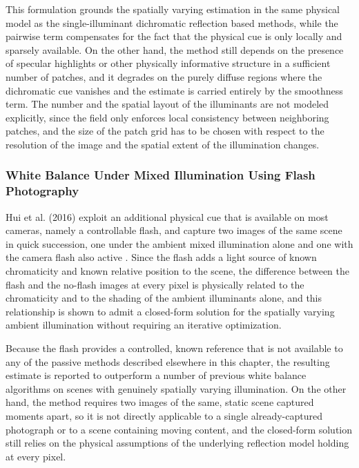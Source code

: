 This formulation grounds the spatially varying estimation in the same physical model as the single-illuminant dichromatic reflection based methods, while the pairwise term compensates for the fact that the physical cue is only locally and sparsely available. On the other hand, the method still depends on the presence of specular highlights or other physically informative structure in a sufficient number of patches, and it degrades on the purely diffuse regions where the dichromatic cue vanishes and the estimate is carried entirely by the smoothness term. The number and the spatial layout of the illuminants are not modeled explicitly, since the field only enforces local consistency between neighboring patches, and the size of the patch grid has to be chosen with respect to the resolution of the image and the spatial extent of the illumination changes.

\subsubsection{White Balance Under Mixed Illumination Using Flash Photography}

Hui et al. (2016) exploit an additional physical cue that is available on most cameras, namely a controllable flash, and capture two images of the same scene in quick succession, one under the ambient mixed illumination alone and one with the camera flash also active \cite{huiMixedIlluminationFlashPhotography}. Since the flash adds a light source of known chromaticity and known relative position to the scene, the difference between the flash and the no-flash images at every pixel is physically related to the chromaticity and to the shading of the ambient illuminants alone, and this relationship is shown to admit a closed-form solution for the spatially varying ambient illumination without requiring an iterative optimization.

Because the flash provides a controlled, known reference that is not available to any of the passive methods described elsewhere in this chapter, the resulting estimate is reported to outperform a number of previous white balance algorithms on scenes with genuinely spatially varying illumination. On the other hand, the method requires two images of the same, static scene captured moments apart, so it is not directly applicable to a single already-captured photograph or to a scene containing moving content, and the closed-form solution still relies on the physical assumptions of the underlying reflection model holding at every pixel.

